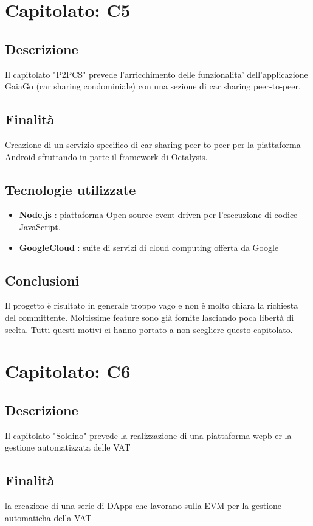 \documentclass{article}
\begin{document}
\newpage
	\section{Capitolato: C5}
		\subsection{Descrizione}
			Il capitolato "P2PCS" prevede l'arricchimento delle funzionalita' dell'applicazione GaiaGo (car sharing condominiale) con una sezione di car sharing peer-to-peer.
		\subsection{Finalità}
			Creazione di un servizio specifico di car sharing peer-to-peer per la piattaforma Android sfruttando in parte il framework di Octalysis.
		\subsection{Tecnologie utilizzate}
			\begin{itemize}
				\item \textbf{Node.js} : piattaforma Open source event-driven per l'esecuzione di codice JavaScript.
				\item \textbf{GoogleCloud} : suite di servizi di cloud computing offerta da Google
			\end{itemize}
		\subsection{Conclusioni}
			Il progetto è risultato in generale troppo vago e non è molto chiara la richiesta del committente. Moltissime feature sono già fornite lasciando poca libertà di scelta. Tutti questi motivi ci hanno portato a non scegliere questo capitolato.
\newpage

\newpage
\section{Capitolato: C6}
	\subsection{Descrizione}
		Il capitolato "Soldino" prevede la realizzazione di una piattaforma wepb er la gestione automatizzata delle VAT
	\subsection{Finalità}
		la creazione di una serie di DApps che lavorano sulla EVM per la gestione automaticha della VAT
\end{document}
